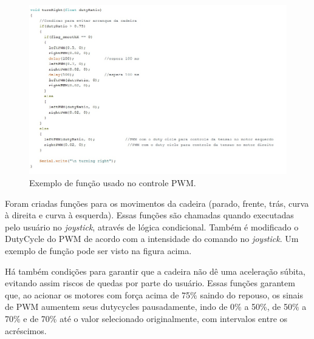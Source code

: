 \begin{figure}[h!]
  \centering
  \includegraphics[width=1.0\textwidth]{figuras/Funcoes.jpg}
  \caption{Exemplo de função usado no controle PWM.}
    \label{fig:funcoes}
\end{figure}

Foram criadas funções para os movimentos da cadeira (parado, frente, trás,
curva à direita e curva à esquerda). Essas funções são chamadas quando
executadas pelo usuário no \textit{joystick}, através de lógica condicional.
Também é modificado o DutyCycle do PWM de acordo com a intensidade do comando no
\textit{joystick}. Um exemplo de função pode ser visto na figura acima.

Há também condições para garantir que a cadeira não dê uma aceleração súbita,
evitando assim riscos de quedas por parte do usuário. Essas funções garantem
que, ao acionar os motores com força acima de 75\% saindo do repouso, os sinais
de PWM aumentem seus dutycycles pausadamente, indo de 0\% a 50\%, de 50\% a
70\% e de 70\% até o valor selecionado originalmente, com intervalos entre os acréscimos.


